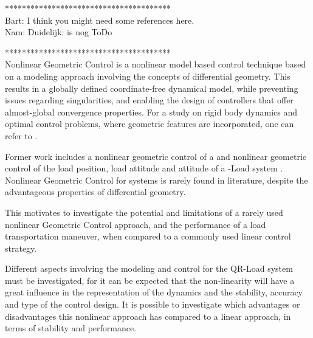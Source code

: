 ***************************************\\
Bart: I think you might need some references here.\\
Nam: Duidelijk: is nog ToDo

***************************************\\


Nonlinear Geometric Control is a nonlinear model based control technique based on a modeling approach involving the concepts of differential geometry. This results in a globally defined coordinate-free dynamical model, while preventing issues regarding singularities, and enabling the design of controllers that offer almost-global convergence properties. %
For a study on rigid body dynamics and optimal control problems, where geometric features are incorporated, one can refer to \cite{Lee2008}. 

Former work includes a nonlinear geometric control of a  \cite{Lee2010,Goodarzi2013a} and nonlinear geometric control of the load position, load attitude and  attitude of a -Load system \cite{Sreenath2013a,Sreenath2013b,Tang2014}.
Nonlinear Geometric Control for  systems is rarely found in literature, despite the advantageous properties of differential geometry. 

This motivates to investigate the potential and limitations of a rarely used nonlinear Geometric Control approach, and the performance of a load transportation maneuver, when compared to a commonly used linear control strategy.

Different aspects involving the modeling and control for the QR-Load system must be investigated, for it can be expected that the non-linearity will have a great influence in the representation of the dynamics and the stability, accuracy and type of the control design.
It is possible to investigate which advantages or disadvantages this nonlinear approach has compared to a linear approach, in terms of stability and performance.

%

